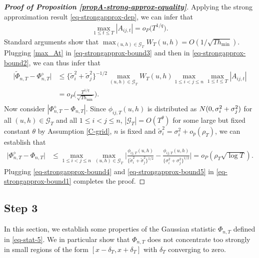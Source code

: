 \documentclass[a4paper,12pt]{article}
\begin{document}
\begin{proof}[\textnormal{\textbf{Proof of Proposition \ref{propA-strong-approx-equality}}}]
Applying the strong approximation result \eqref{eq-strongapprox-dep}, we can infer that
\begin{align}\label{max_At}
\max_{1 \le t \le T} |A_{ij, t}|  =o_P\big(T^{1/q}\big). 
\end{align}
Standard arguments show that $\max_{(u,h) \in \mathcal{G}_T} W_T(u,h) = O( 1/\sqrt{Th_{\min}} )$. Plugging \eqref{max_At} in \eqref{eq-strongapprox-bound3} and then in \eqref{eq-strongapprox-bound2}, we can thus infer that 
\begin{align}\label{eq-strongapprox-bound4}
\begin{split}
\big| \widetilde{\Phi}_{n, T} - \Phi_{n, T}^{\diamond} \big| &\le \{\widetilde{\sigma}_i^2 + \widetilde{\sigma}_j^2 \}^{-1/2}  \max_{(u,h) \in \mathcal{G}_T} W_T(u, h) \max_{1\le i < j \le n}\max_{1\le t \le T} |A_{ij, t}|\\
&= o_P\Big( \frac{T^{1/q}}{\sqrt{Th_{\min}}} \Big).
\end{split}
\end{align}
Now consider $|\Phi_{n, T}^{\diamond} - \Phi_{n, T}|$. Since $\phi_{ij, T}(u,h)$ is distributed as $ N(0,{\sigma}^2_i + {\sigma}^2_j)$ for all $(u,h) \in \mathcal{G}_T$ and all $1\le i < j \le n$, $|\mathcal{G}_T| = O(T^\theta)$ for some large but fixed constant $\theta$ by Assumption \ref{C-grid}, $n$ is fixed and $\widetilde{\sigma}^2_i = \sigma^2_i + o_p(\rho_T)$, we can establish that
\begin{align}\label{eq-strongapprox-bound5}
\big| \Phi_{n, T}^{\diamond} - \Phi_{n, T} \big| &\le \max_{1\leq i< j \leq n}\max_{(u,h) \in \mathcal{G}_T} \Big|\frac{\phi_{ij, T}(u,h)}{\{\widetilde{\sigma}_i^2 + \widetilde{\sigma}_j^2 \}^{1/2}} - \frac{\phi_{ij, T}(u,h)}{\{{\sigma}_i^2 + {\sigma}_j^2 \}^{1/2}}\Big| = o_P(\rho_T \sqrt{\log T}).
\end{align}
Plugging \eqref{eq-strongapprox-bound4} and \eqref{eq-strongapprox-bound5} in \eqref{eq-strongapprox-bound1} completes the proof.
\end{proof}




\subsection*{Step 3}


In this section, we establish some properties of the Gaussian statistic $\Phi_{n,T}$ defined in \eqref{eq-stat-5}. We in particular show that $\Phi_{n,T}$ does not concentrate too strongly in small regions of the form $[x-\delta_T,x+\delta_T]$ with $\delta_T$ converging to zero.  
\end{document}
